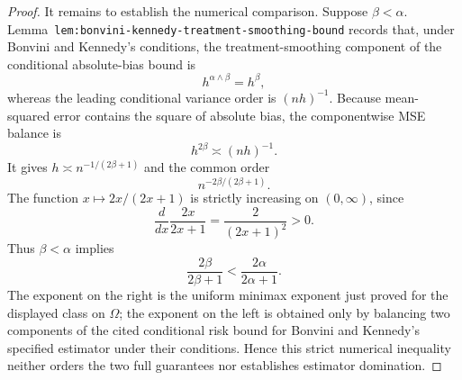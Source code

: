 \documentclass{article}
\begin{document}
\begin{proof}
It remains to establish the numerical comparison. Suppose \(\beta<\alpha\). Lemma~\texttt{lem:bonvini-kennedy-treatment-smoothing-bound} records that, under Bonvini and Kennedy's conditions, the treatment-smoothing component of the conditional absolute-bias bound is
\[
h^{\alpha\wedge\beta}=h^\beta,
\]
whereas the leading conditional variance order is \((nh)^{-1}\). Because mean-squared error contains the square of absolute bias, the componentwise MSE balance is
\[
h^{2\beta}\asymp(nh)^{-1}.
\]
It gives \(h\asymp n^{-1/(2\beta+1)}\) and the common order
\[
n^{-2\beta/(2\beta+1)}.
\]
The function \(x\mapsto 2x/(2x+1)\) is strictly increasing on \((0,\infty)\), since
\[
\frac{d}{dx}\frac{2x}{2x+1}=\frac{2}{(2x+1)^2}>0.
\]
Thus \(\beta<\alpha\) implies
\[
\frac{2\beta}{2\beta+1}<\frac{2\alpha}{2\alpha+1}.
\]
The exponent on the right is the uniform minimax exponent just proved for the displayed class on \(\Omega\); the exponent on the left is obtained only by balancing two components of the cited conditional risk bound for Bonvini and Kennedy's specified estimator under their conditions. Hence this strict numerical inequality neither orders the two full guarantees nor establishes estimator domination.
\end{proof}
\end{document}
